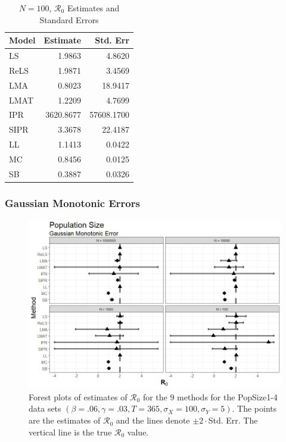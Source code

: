 \documentclass[12pt]{article}
\newcommand{\xxsir}{\ensuremath{9} } %
\newcommand{\rr}{\ensuremath{\mathcal{R}_0}}
\begin{document}
\begin{table}[H]
	
	\centering
	\begin{tabular}[t]{l|r|r}
		\hline
		Model & Estimate & Std. Err\\
		\hline
		LS & 1.9863 & 4.8620\\
		\hline
		ReLS & 1.9871 & 3.4569\\
		\hline
		LMA & 0.8023 & 18.9417\\
		\hline
		LMAT & 1.2209 & 4.7699\\
		\hline
		IPR & 3620.8677 & 57608.1700\\
		\hline
		SIPR & 3.3678 & 22.4187\\
		\hline
		LL & 1.1413 & 0.0422\\
		\hline
		MC & 0.8456 & 0.0125\\
		\hline
		SB & 0.3887 & 0.0326\\
		\hline
	\end{tabular}
\caption{$N = 100$, $\rr$ Estimates and Standard Errors}\label{tab:n2-res2}
\end{table}

\subsubsection{Gaussian Monotonic Errors}

\begin{figure}[H]
	\centering
	\includegraphics[scale=0.5]{images/popsize_nm.jpeg}
	\caption{Forest plots of estimates of $\rr$ for the \xxsir methods for the PopSize1-4 data sets $(\beta=.06, \gamma=.03, T=365, \sigma_X=100, \sigma_Y=5)$.  The points are the estimates of $\rr$ and the lines denote $\pm 2\cdot $Std. Err.  The vertical line is the true $\rr$ value.}
\end{figure}
\end{document}
